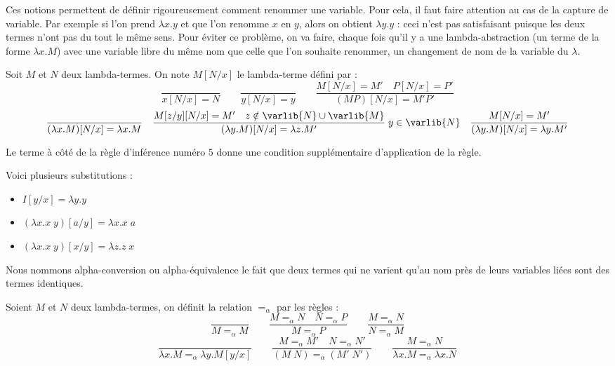 Ces notions permettent de définir rigoureusement comment renommer une variable. Pour cela, il faut faire attention au cas de la capture de variable. Par exemple si l'on prend $\lambda x.y$ et que l'on renomme $x$ en $y$, alors on obtient $\lambda y.y$ : ceci n'est pas satisfaisant puisque les deux termes n'ont pas du tout le même sens. Pour éviter ce problème, on va faire, chaque fois qu'il y a une lambda-abstraction (un terme de la forme $\lambda x.M$) avec une variable libre du même nom que celle que l'on souhaite renommer, un changement de nom de la variable du $\lambda$.

\begin{defi}[Substitution]
    Soit $M$ et $N$ deux lambda-termes. On note $M[N/x]$ le lambda-terme défini par :
    $$ \dfrac{}{x[N/x]=N}\qquad \dfrac{}{y[N/x]=y}\qquad\dfrac{M[N/x]=M'\quad P[N/x]=P'}{(M P)[N/x] = M' P'}$$$$\dfrac{}{(\lambda x.M)[N/x]=\lambda x.M}\quad\dfrac{M[z/y][N/x]=M'\quad z\notin\varlib{N}\cup\varlib{M}}{(\lambda y.M)[N/x]=\lambda z.M'}\;y\in\varlib{N}  \quad\dfrac{M[N/x]=M'}{(\lambda y.M)[N/x]=\lambda y.M'}$$
    
    Le terme à côté de la règle d'inférence numéro $5$ donne une condition supplémentaire d'application de la règle.
\end{defi}

\begin{expl}
    Voici plusieurs substitutions :
    \begin{itemize}[label=$\bullet$]
        \item $I[y/x] = \lambda y.y$
        \item $(\lambda x.x\; y)[a/y] = \lambda x.x\; a$
        \item $(\lambda x.x\;y)[x/y] = \lambda z.z\; x$
    \end{itemize}
\end{expl}

Nous nommons alpha-conversion ou alpha-équivalence le fait que deux termes qui ne varient qu'au nom près de leurs variables liées sont des termes identiques.

\begin{defi}
    Soient $M$ et $N$ deux lambda-termes, on définit la relation $=_\alpha$ par les règles :
    $$\dfrac{}{M=_\alpha M}\qquad\dfrac{M =_\alpha N \quad N=_\alpha P}{M=_\alpha P}\qquad \dfrac{M=_\alpha N}{N=_\alpha M}$$
    $$\dfrac{}{\lambda x.M =_\alpha \lambda y.M[y/x]}\qquad\dfrac{M=_\alpha M' \quad N=_\alpha N'}{(M\;N) =_\alpha (M'\;N')}\qquad\dfrac{M=_\alpha N}{\lambda x. M =_\alpha \lambda x. N}$$
\end{defi}

